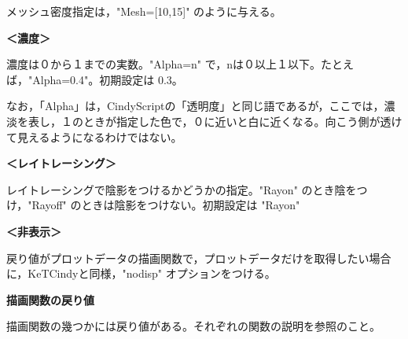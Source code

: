 \documentclass[papersize,a4paper,12pt,uplatex]{jsarticle}
\begin{document}
メッシュ密度指定は，"Mesh=[10,15]" のように与える。

\textbf{＜濃度＞} 

濃度は０から１までの実数。"Alpha=n" で，nは０以上１以下。たとえば，"Alpha=0.4"。初期設定は 0.3。

なお，「Alpha」は，CindyScriptの「透明度」と同じ語であるが，ここでは，濃淡を表し，１のときが指定した色で，０に近いと白に近くなる。向こう側が透けて見えるようになるわけではない。

\textbf{＜レイトレーシング＞} 

レイトレーシングで陰影をつけるかどうかの指定。"Rayon" のとき陰をつけ，"Rayoff" のときは陰影をつけない。初期設定は "Rayon" 

\textbf{＜非表示＞} 

戻り値がプロットデータの描画関数で，プロットデータだけを取得したい場合に，KeTCindyと同様，"nodisp" オプションをつける。

\vspace{\baselineskip}
\textbf{描画関数の戻り値}

 描画関数の幾つかには戻り値がある。それぞれの関数の説明を参照のこと。 
\end{document}

